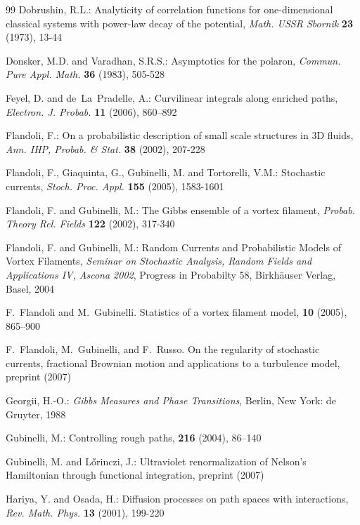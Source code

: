 \documentclass[a4paper,11pt]{article}
\begin{document}
\begin{thebibliography}{99}
Dobrushin, R.L.: Analyticity of correlation functions for
one-dimensional classical systems with power-law decay of the
potential, {\em Math. USSR Sbornik} {\bf 23} (1973), 13-44 


Donsker, M.D. and Varadhan, S.R.S.: Asymptotics for the polaron, 
{\it  Commun. Pure Appl. Math.} {\bf 36} (1983), 505-528

{Feyel, D. and de~La~Pradelle, A.}:
{Curvilinear integrals along enriched paths},
{\em Electron. J. Probab.} {\bf 11} (2006), {860--892}
                
Flandoli, F.: On a probabilistic description of small scale
structures in 3D fluids, \textit{Ann. IHP, Probab. \& Stat.} 
\textbf{38} (2002), 207-228

Flandoli, F., Giaquinta, G., Gubinelli, M. and Tortorelli, V.M.:
Stochastic currents, \textit{Stoch. Proc. Appl.} \textbf{155} 
(2005), 1583-1601

Flandoli, F. and Gubinelli, M.: The Gibbs ensemble of a vortex
filament, \textit{Probab. Theory Rel. Fields} \textbf{122} (2002), 
317-340

Flandoli, F. and Gubinelli, M.: Random Currents and Probabilistic 
Models of Vortex Filaments, \textit{Seminar on Stochastic Analysis, 
Random Fields and Applications IV, Ascona 2002}, Progress in 
Probabilty 58, Birkh\"auser Verlag, Basel, 2004

F.~Flandoli and M.~Gubinelli.
\newblock Statistics of a vortex filament model,
 {\bf 10} (2005), 865--900

F.~Flandoli, M.~Gubinelli, and F.~Russo.
\newblock On the regularity of stochastic currents, fractional 
Brownian motion and applications to a turbulence model,
\newblock preprint (2007)

Georgii, H.-O.: {\it Gibbs Measures and Phase Transitions}, 
Berlin, New York: de Gruyter, 1988

Gubinelli, M.:
\newblock Controlling rough paths,
 {\bf 216} (2004), 86--140 


Gubinelli, M. and L\H{o}rinczi, J.: Ultraviolet renormalization of 
Nelson's Hamiltonian through functional integration, preprint (2007)

Hariya, Y. and Osada, H.: Diffusion processes on path spaces with 
interactions, {\it Rev. Math. Phys.} {\bf 13} (2001), 199-220


\end{thebibliography}
\end{document}
